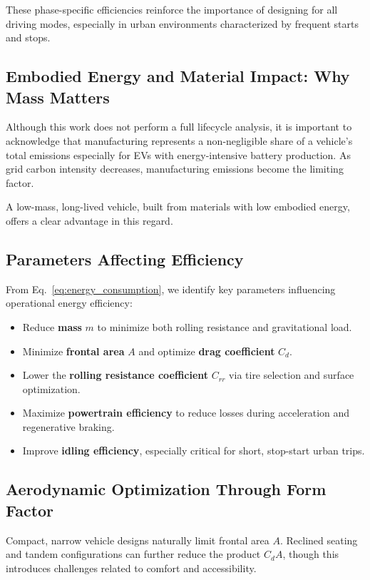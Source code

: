 These phase-specific efficiencies reinforce the importance of designing for all driving modes, especially in urban environments characterized by frequent starts and stops.

\subsection{Embodied Energy and Material Impact: Why Mass Matters}

Although this work does not perform a full lifecycle analysis, it is important to acknowledge that manufacturing represents a non-negligible share of a vehicle’s total emissions especially for EVs with energy-intensive battery production. As grid carbon intensity decreases, manufacturing emissions become the limiting factor.

A low-mass, long-lived vehicle, built from materials with low embodied energy, offers a clear advantage in this regard.

\newpage 

\subsection{Parameters Affecting Efficiency}

From Eq.~\eqref{eq:energy_consumption}, we identify key parameters influencing operational energy efficiency:

\begin{itemize}
    \item Reduce \textbf{mass} \(m\) to minimize both rolling resistance and gravitational load.
    \item Minimize \textbf{frontal area} \(A\) and optimize \textbf{drag coefficient} \(C_d\).
    \item Lower the \textbf{rolling resistance coefficient} \(C_{rr}\) via tire selection and surface optimization.
    \item Maximize \textbf{powertrain efficiency} to reduce losses during acceleration and regenerative braking.
    \item Improve \textbf{idling efficiency}, especially critical for short, stop-start urban trips.
\end{itemize}

\subsection{Aerodynamic Optimization Through Form Factor}

Compact, narrow vehicle designs naturally limit frontal area \(A\). Reclined seating and tandem configurations can further reduce the product \(C_d A\), though this introduces challenges related to comfort and accessibility.


